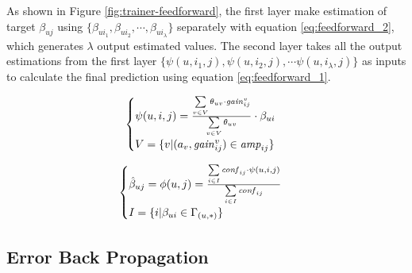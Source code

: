 \documentclass[conference,compsoc]{IEEEtran}
\begin{document}
As shown in  Figure \ref{fig:trainer-feedforward}, the first layer make estimation of target $\beta_{uj}$ using $\{\beta_{ui_1}, \beta_{ui_2}, \cdots, \beta_{ui_\lambda}\}$ separately with equation \ref{eq:feedforward_2}, which generates $\lambda$ output estimated values. The second layer takes all the output
estimations from the first layer $\{\psi(u,i_1,j),\psi(u,i_2,j),\cdots \psi(u,i_\lambda,j)\}$ as
inputs to calculate the final prediction using equation
\ref{eq:feedforward_1}.


\newcommand{\wconf}[3]{\sum\limits_{{#2}:\beta_{{#1}{#2}}\in\Gamma_{({#1},*)}} \confi{{#2}{#3}}\cdot \psi({#1},{#2},{#3})}
\newcommand{\sconf}[3]{\sum\limits_{{#2}:\beta_{{#1}{#2}}\in\Gamma_{({#1},*)}} \confi{{#2}{#3}}}

\newcommand{\wtheta}[2]{\sum \limits_{{#2}:(a_{#2},\gain{{#2}}{ij})\in\amp{ij}} \theta_{{#1}{#2}} \cdot \gain{{#2}}{ij}}
\newcommand{\stheta}[2]{\sum \limits_{{#2}:(a_{#2},\gain{{#2}}{ij})\in\amp{ij}} \theta_{{#1}{#2}}}



\begin{equation}
  \label{eq:feedforward_2}
  \begin{cases}   
    \psi (u,i,j) = \frac{\sum \limits_{v\in V} \theta_{uv} \cdot \gain{{v}}{ij}}{\sum \limits_{v\in V} \theta_{uv}} \cdot \beta_{ui} \\
    V=\{v|(a_{v},\gain{{v}}{ij})\in\amp{ij}\}
   \end{cases}
\end{equation}

\begin{equation}
  \label{eq:feedforward_1}
  \begin{cases}    \hat{\beta}_{uj}=\phi(u,j)=\frac{\sum\limits_{i\in I} \confi{ij}\cdot \psi(u,i,j)}{\sum\limits_{i\in I} \confi{ij}} \\
  	    I=\{i|\beta_{ui}\in\Gamma_{(u,*)}\}
  \end{cases}
\end{equation}


\subsection{Error Back Propagation}
\label{sec:bp}
\end{document}
